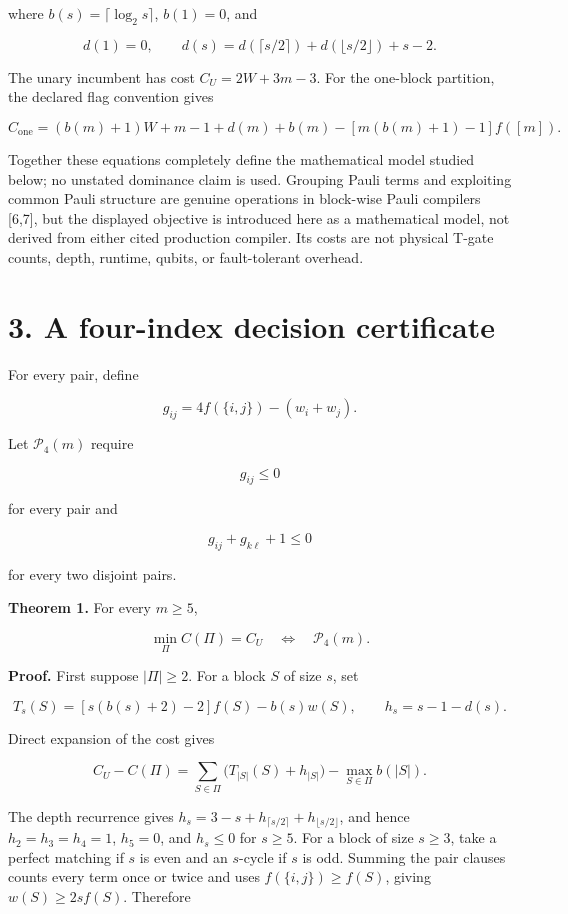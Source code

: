 \documentclass[
  11pt,
]{article}
\begin{document}
where \(b(s)=\lceil\log_2s\rceil\), \(b(1)=0\), and

\[
d(1)=0, \qquad
d(s)=d(\lceil s/2\rceil)+d(\lfloor s/2\rfloor)+s-2.
\]

The unary incumbent has cost \(C_U=2W+3m-3\). For the one-block
partition, the declared flag convention gives

\[
C_{\mathrm{one}}=(b(m)+1)W+m-1+d(m)+b(m)
-[m(b(m)+1)-1]f([m]).
\]

Together these equations completely define the mathematical model
studied below; no unstated dominance claim is used. Grouping Pauli terms
and exploiting common Pauli structure are genuine operations in
block-wise Pauli compilers {[}6,7{]}, but the displayed objective is
introduced here as a mathematical model, not derived from either cited
production compiler. Its costs are not physical T-gate counts, depth,
runtime, qubits, or fault-tolerant overhead.

\hypertarget{a-four-index-decision-certificate}{%
\section{3. A four-index decision
certificate}\label{a-four-index-decision-certificate}}

For every pair, define

\[
g_{ij}=4f(\{i, j\})-(w_i+w_j).
\]

Let \(\mathcal P_4(m)\) require

\[
g_{ij}\le0
\]

for every pair and

\[
g_{ij}+g_{k\ell}+1\le0
\]

for every two disjoint pairs.

\textbf{Theorem 1.} For every \(m\ge5\),

\[
\min_\Pi C(\Pi)=C_U
\quad\Longleftrightarrow\quad
\mathcal P_4(m).
\]

\textbf{Proof.} First suppose \(|\Pi|\ge2\). For a block \(S\) of size
\(s\), set

\[
T_s(S)=[s(b(s)+2)-2]f(S)-b(s)w(S),
\qquad h_s=s-1-d(s).
\]

Direct expansion of the cost gives

\[
C_U-C(\Pi)=\sum_{S\in\Pi}\bigl(T_{|S|}(S)+h_{|S|}\bigr)
-\max_{S\in\Pi}b(|S|).
\]

The depth recurrence gives
\(h_s=3-s+h_{\lceil s/2\rceil}+h_{\lfloor s/2\rfloor}\), and hence
\(h_2=h_3=h_4=1\), \(h_5=0\), and \(h_s\le0\) for \(s\ge5\). For a block
of size \(s\ge3\), take a perfect matching if \(s\) is even and an
\(s\)-cycle if \(s\) is odd. Summing the pair clauses counts every term
once or twice and uses \(f(\{i,j\})\ge f(S)\), giving
\(w(S)\ge2s f(S)\). Therefore
\end{document}
